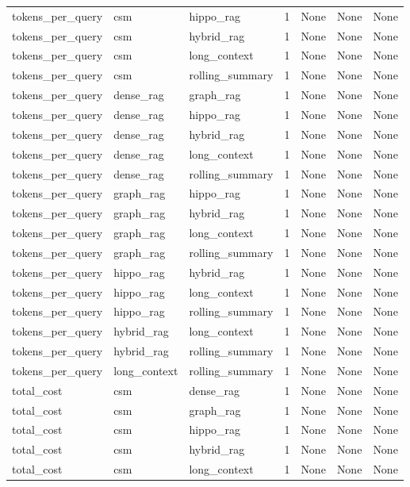 \begin{tabular}{lllllll}
tokens\_per\_query & csm & hippo\_rag & 1 & None & None & None \\
tokens\_per\_query & csm & hybrid\_rag & 1 & None & None & None \\
tokens\_per\_query & csm & long\_context & 1 & None & None & None \\
tokens\_per\_query & csm & rolling\_summary & 1 & None & None & None \\
tokens\_per\_query & dense\_rag & graph\_rag & 1 & None & None & None \\
tokens\_per\_query & dense\_rag & hippo\_rag & 1 & None & None & None \\
tokens\_per\_query & dense\_rag & hybrid\_rag & 1 & None & None & None \\
tokens\_per\_query & dense\_rag & long\_context & 1 & None & None & None \\
tokens\_per\_query & dense\_rag & rolling\_summary & 1 & None & None & None \\
tokens\_per\_query & graph\_rag & hippo\_rag & 1 & None & None & None \\
tokens\_per\_query & graph\_rag & hybrid\_rag & 1 & None & None & None \\
tokens\_per\_query & graph\_rag & long\_context & 1 & None & None & None \\
tokens\_per\_query & graph\_rag & rolling\_summary & 1 & None & None & None \\
tokens\_per\_query & hippo\_rag & hybrid\_rag & 1 & None & None & None \\
tokens\_per\_query & hippo\_rag & long\_context & 1 & None & None & None \\
tokens\_per\_query & hippo\_rag & rolling\_summary & 1 & None & None & None \\
tokens\_per\_query & hybrid\_rag & long\_context & 1 & None & None & None \\
tokens\_per\_query & hybrid\_rag & rolling\_summary & 1 & None & None & None \\
tokens\_per\_query & long\_context & rolling\_summary & 1 & None & None & None \\
total\_cost & csm & dense\_rag & 1 & None & None & None \\
total\_cost & csm & graph\_rag & 1 & None & None & None \\
total\_cost & csm & hippo\_rag & 1 & None & None & None \\
total\_cost & csm & hybrid\_rag & 1 & None & None & None \\
total\_cost & csm & long\_context & 1 & None & None & None \\

\end{tabular}
